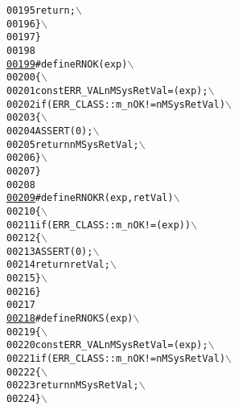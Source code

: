 \begin{footnotesize}
\begin{alltt}
00195 \textcolor{preprocessor}{        return;                   \(\backslash\)}
00196 \textcolor{preprocessor}{        \}                           \(\backslash\)}
00197 \textcolor{preprocessor}{        \}}
00198 \textcolor{preprocessor}{}
\hypertarget{_macros_8h_source_l00199}{}\hyperlink{_macros_8h_ac5b8acf304861a90676f9b606d9ac413}{00199} \textcolor{preprocessor}{#define RNOK( exp )               \(\backslash\)}
00200 \textcolor{preprocessor}{\{                                 \(\backslash\)}
00201 \textcolor{preprocessor}{        const ERR\_VAL nMSysRetVal = ( exp );   \(\backslash\)}
00202 \textcolor{preprocessor}{        if( ERR\_CLASS::m\_nOK != nMSysRetVal )  \(\backslash\)}
00203 \textcolor{preprocessor}{\{                               \(\backslash\)}
00204 \textcolor{preprocessor}{        ASSERT( 0 );                  \(\backslash\)}
00205 \textcolor{preprocessor}{        return nMSysRetVal;                  \(\backslash\)}
00206 \textcolor{preprocessor}{        \}                               \(\backslash\)}
00207 \textcolor{preprocessor}{        \}}
00208 \textcolor{preprocessor}{}
\hypertarget{_macros_8h_source_l00209}{}\hyperlink{_macros_8h_a97dc3621e334c0f3e4825c703bf69520}{00209} \textcolor{preprocessor}{#define RNOKR( exp, retVal )        \(\backslash\)}
00210 \textcolor{preprocessor}{\{                                   \(\backslash\)}
00211 \textcolor{preprocessor}{        if( ERR\_CLASS::m\_nOK != ( exp ) ) \(\backslash\)}
00212 \textcolor{preprocessor}{\{                                 \(\backslash\)}
00213 \textcolor{preprocessor}{        ASSERT( 0 );                    \(\backslash\)}
00214 \textcolor{preprocessor}{        return retVal;                  \(\backslash\)}
00215 \textcolor{preprocessor}{        \}                                 \(\backslash\)}
00216 \textcolor{preprocessor}{        \}}
00217 \textcolor{preprocessor}{}
\hypertarget{_macros_8h_source_l00218}{}\hyperlink{_macros_8h_a63f185001b7292b94d89d6f17c20954d}{00218} \textcolor{preprocessor}{#define RNOKS( exp )                \(\backslash\)}
00219 \textcolor{preprocessor}{\{                                   \(\backslash\)}
00220 \textcolor{preprocessor}{        const ERR\_VAL nMSysRetVal = ( exp );     \(\backslash\)}
00221 \textcolor{preprocessor}{        if( ERR\_CLASS::m\_nOK != nMSysRetVal )    \(\backslash\)}
00222 \textcolor{preprocessor}{\{                                 \(\backslash\)}
00223 \textcolor{preprocessor}{        return nMSysRetVal;             \(\backslash\)}
00224 \textcolor{preprocessor}{        \}                                 \(\backslash\)}

\end{alltt}
\end{footnotesize}
